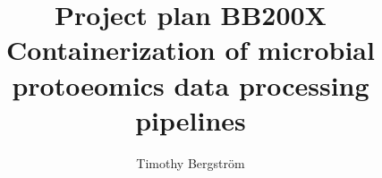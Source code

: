 \begin{titlepage}
\title{\vspace{60mm} \bf
        Project plan BB200X\\
        \large Containerization of microbial \\
        protoeomics data processing pipelines
}  %
\author{Timothy Bergström}
\maketitle
\thispagestyle{fancy}  %
\vspace*{\fill}
\end{titlepage}
